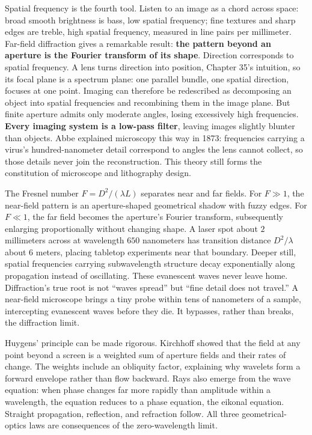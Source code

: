 \begin{mathbridge}
Spatial frequency is the fourth tool. Listen to an image as a chord across space: broad smooth brightness is bass, low spatial frequency; fine textures and sharp edges are treble, high spatial frequency, measured in line pairs per millimeter. Far-field diffraction gives a remarkable result: \textbf{the pattern beyond an aperture is the Fourier transform of its shape}. Direction corresponds to spatial frequency. A lens turns direction into position, Chapter 35's intuition, so its focal plane is a spectrum plane: one parallel bundle, one spatial direction, focuses at one point. Imaging can therefore be redescribed as decomposing an object into spatial frequencies and recombining them in the image plane. But finite aperture admits only moderate angles, losing excessively high frequencies. \textbf{Every imaging system is a low-pass filter}, leaving images slightly blunter than objects. Abbe explained microscopy this way in 1873: frequencies carrying a virus's hundred-nanometer detail correspond to angles the lens cannot collect, so those details never join the reconstruction. This theory still forms the constitution of microscope and lithography design.
\end{mathbridge}

\begin{challenge}
The Fresnel number \(F=D^2/(\lambda L)\) separates near and far fields. For \(F\gg1\), the near-field pattern is an aperture-shaped geometrical shadow with fuzzy edges. For \(F\ll1\), the far field becomes the aperture's Fourier transform, subsequently enlarging proportionally without changing shape. A laser spot about \(2\) millimeters across at wavelength \(650\) nanometers has transition distance \(D^2/\lambda\) about \(6\) meters, placing tabletop experiments near that boundary. Deeper still, spatial frequencies carrying subwavelength structure decay exponentially along propagation instead of oscillating. These evanescent waves never leave home. Diffraction's true root is not ``waves spread'' but ``fine detail does not travel.'' A near-field microscope brings a tiny probe within tens of nanometers of a sample, intercepting evanescent waves before they die. It bypasses, rather than breaks, the diffraction limit.
\end{challenge}

\begin{challenge}
Huygens' principle can be made rigorous. Kirchhoff showed that the field at any point beyond a screen is a weighted sum of aperture fields and their rates of change. The weights include an obliquity factor, explaining why wavelets form a forward envelope rather than flow backward. Rays also emerge from the wave equation: when phase changes far more rapidly than amplitude within a wavelength, the equation reduces to a phase equation, the eikonal equation. Straight propagation, reflection, and refraction follow. All three geometrical-optics laws are consequences of the zero-wavelength limit.
\end{challenge}

